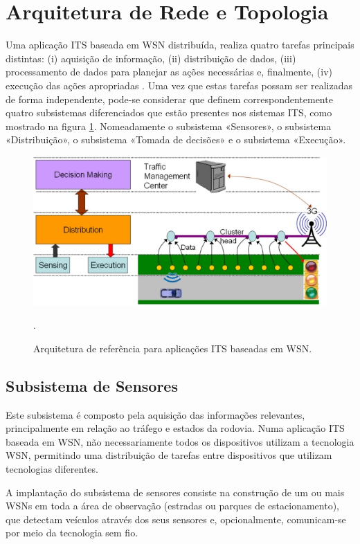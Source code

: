 \documentclass[
	12pt,				%
	oneside,			%
	a4paper,			%
	english,			%
	brazil				%
	]{abntex2ppgsi}
\begin{document}
\section{Arquitetura de Rede e Topologia}

Uma aplicação ITS baseada em WSN distribuída, realiza quatro tarefas principais distintas: (i) aquisição de informação, (ii) distribuição de dados, (iii) processamento de dados para planejar as ações necessárias e, finalmente, (iv) execução das ações apropriadas  \cite{losilla2011comprehensive} . Uma vez que estas tarefas possam ser realizadas de forma independente, pode-se considerar que definem correspondentemente quatro subsistemas diferenciados que estão presentes nos sistemas ITS, como mostrado na figura \ref{fig:arquiteturas_its_wsn}. Nomeadamente o subsistema «Sensores», o subsistema «Distribuição», o subsistema «Tomada de decisões» e o subsistema «Execução». 

\begin{figure}[h!]
	\centering
	\includegraphics[width=0.8\columnwidth]{images/camadas_wsn.jpg}
	\caption{Arquitetura de referência para aplicações ITS baseadas em WSN. \cite{losilla2011comprehensive}}.
	\label{fig:arquiteturas_its_wsn}
\end{figure}

\subsection{Subsistema de Sensores}

Este subsistema é composto pela aquisição das informações relevantes, principalmente em relação ao tráfego e estados da rodovia. Numa aplicação ITS baseada em WSN, não necessariamente todos os dispositivos utilizam a tecnologia WSN, permitindo uma distribuição de tarefas entre dispositivos que utilizam tecnologias diferentes. 

A implantação do subsistema de sensores consiste na construção de um ou mais WSNs em toda a área de observação (estradas ou parques de estacionamento), que detectam veículos através dos seus sensores e, opcionalmente, comunicam-se por meio da tecnologia sem fio. 
\end{document}
